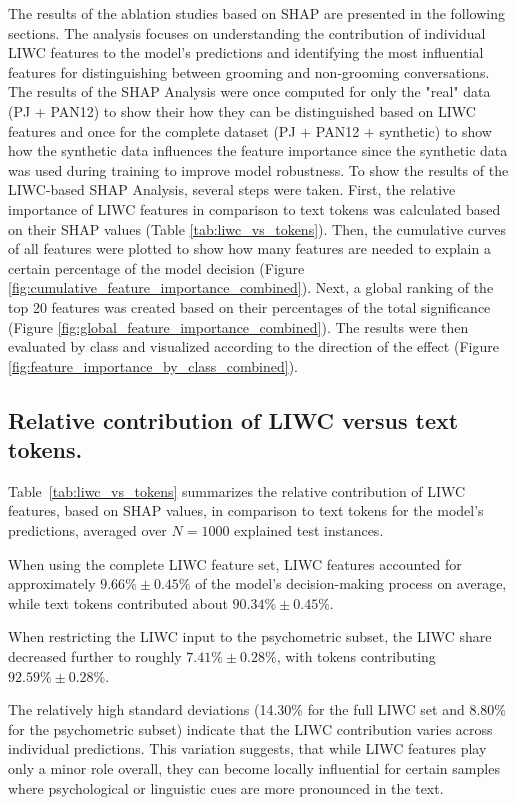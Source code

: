 The results of the ablation studies based on SHAP are presented in the following sections. The analysis focuses on understanding the contribution of individual LIWC features to the model's predictions and identifying the most influential features for distinguishing between grooming and non-grooming conversations. The results of the SHAP Analysis were once computed for only the "real" data (PJ + PAN12) to show their how they can be distinguished based on LIWC features and once for the complete dataset (PJ + PAN12 + synthetic) to show how the synthetic data influences the feature importance since the synthetic data was used during training to improve model robustness. To show the results of the LIWC-based SHAP Analysis, several steps were taken. First, the relative importance of LIWC features in comparison to text tokens was calculated based on their SHAP values (Table \ref{tab:liwc_vs_tokens}). Then, the cumulative curves of all features were plotted to show how many features are needed to explain a certain percentage of the model decision (Figure \ref{fig:cumulative_feature_importance_combined}). Next, a global ranking of the top 20 features was created based on their percentages of the total significance (Figure \ref{fig:global_feature_importance_combined}). The results were then evaluated by class and visualized according to the direction of the effect (Figure \ref{fig:feature_importance_by_class_combined}).

\subsection{Relative contribution of LIWC versus text tokens.}

Table~\ref{tab:liwc_vs_tokens} summarizes the relative contribution of LIWC features, based on SHAP values, in comparison to text tokens for the model’s predictions, averaged over $N = 1000$ explained test instances.  

When using the complete LIWC feature set, LIWC features accounted for approximately $9.66\% \pm 0.45\%$  of the model’s decision-making process on average, while text tokens contributed about $90.34\% \pm 0.45\%$.  

When restricting the LIWC input to the psychometric subset, the LIWC share decreased further to roughly $7.41\% \pm 0.28\%$, with tokens contributing $92.59\% \pm 0.28\%$.  

The relatively high standard deviations (14.30\% for the full LIWC set and 8.80\% for the psychometric subset) indicate that the LIWC contribution varies across individual predictions. This variation suggests, that while LIWC features play only a minor role overall, they can become locally influential for certain samples where psychological or linguistic cues are more pronounced in the text.

